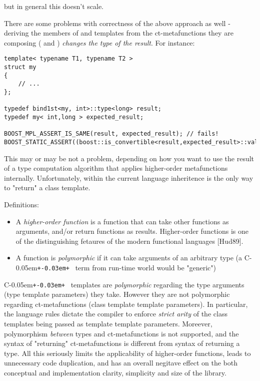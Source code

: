 \documentclass{netobjectdays}
\newcommand{\Cpp}{C\kern-0.05em\texttt{+\kern-0.03em+}%
}
\begin{document}
but in general this doesn't scale. 

There are some problems with correctness of the above 
approach as well - deriving the  members of 
 and  templates from 
the ct-metafunctions they are composing ( and 
) \emph{changes the type of the result}. 
For instance:

{\footnotesize
\begin{verbatim}
template< typename T1, typename T2 >
struct my
{
    // ...
};

typedef bind1st<my, int>::type<long> result;
typedef my< int,long > expected_result;

BOOST_MPL_ASSERT_IS_SAME(result, expected_result); // fails!
BOOST_STATIC_ASSERT((boost::is_convertible<result,expected_result>::value));
\end{verbatim}
}

This may or may be not a problem, depending on how you 
want to use the result of a type computation algorithm 
that applies higher-order metafunctions internally. 
Unfortunately, within the current language inheritence 
is the only way to "return" a class template.




Definitions: 
\begin{itemize}
  \item  A \emph{higher-order function} is a function 
  that can take other functions as arguments, and/or 
  return functions as results. Higher-order functions 
  is one of the distinguishing fetaures of the modern 
  functional languages [Hud89]. 

  \item A function is \emph{polymorphic} if it can 
  take arguments of an arbitrary type (a \Cpp\ term 
  from run-time world would be "generic")
\end{itemize}

\Cpp\ templates are \emph{polymorphic} regarding the type 
arguments (type template parameters) they take. However they 
are not polymorphic regarding ct-metafunctions (class 
template template parameters). In particular, the language 
rules dictate the compiler to enforce \emph{strict arity} of 
the class templates being passed as template template 
parameters. Moreever, polymorphism \emph{between} types and 
ct-metafunctions is not supported, and the syntax of 
"returning" ct-metafunctions is different from syntax of 
returning a type. All this seriously limits the 
applicability of higher-order functions, leads to 
unnecessary code duplication, and has an overall negitave 
effect on the both conceptual and implementation clarity, 
simplicity and size of the library.
\end{document}
